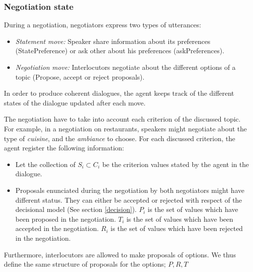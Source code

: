 \documentclass{llncs}
\begin{document}
	
	\subsubsection{Negotiation state}
	During a negotiation, negotiators express two types of utterances: %
	
	\begin{itemize} [noitemsep]
	\item \emph{Statement move:} Speaker share information about its preferences (StatePreference) or ask other about his preferences (askPreferences).
	\item \emph{Negotiation move:} Interlocutors negotiate about the different options of a topic (Propose, accept or reject proposals).
	\end{itemize}
	
	
	In order to produce coherent dialogues, the agent keeps track of the different states of the dialogue updated after each move. 
	
	The negotiation have to take into account each criterion of the discussed topic. For example, in a negotiation on restaurants, speakers might negotiate about the type of \textit{cuisine}, and the \textit{ambiance} to choose.  
	For each discussed criterion, the agent register the following information:
	\begin{itemize} [noitemsep]
	\item Let the collection of $S_i \subset C_i$ be the criterion values stated by the agent in the dialogue.
	\item Proposals enunciated during the negotiation by both negotiators might have different status. They can either be accepted or rejected with respect of the decisional model (See section \ref{decision}).
	\subitem  $P_i$ is the set of  values which have been proposed in the negotiation.
	\subitem  $T_i$  is the set of values which have been accepted in the negotiation.
	\subitem  $R_i$  is the set of values which have been rejected in the negotiation.
	\end{itemize}
	
	Furthermore, interlocutors are allowed to make proposals of options. We thus define the same structure of proposals for the options; $P, R, T$
	
\end{document}
